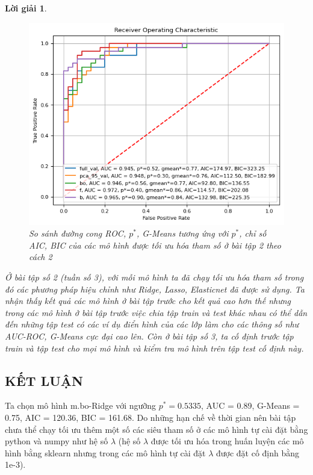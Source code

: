 \documentclass[14pt, a4paper]{article}
\theoremstyle{sltheorem}
\theoremstyle{soltheorem}
\newtheorem*{loigiai}{Lời giải}
\begin{document}
\begin{loigiai}
    \begin{figure}[h!]
        \centering
        \includegraphics[width=1.0\textwidth]{figures/ROC_Curve_AIC_BIC_Excercise_2_2.png}
        \caption{ So sánh đường cong ROC, $p^*$, G-Means tương ứng với $p^*$, chỉ số AIC, BIC của các mô hình được tối ưu hóa tham số ở bài tập 2 theo cách 2}
        \label{fig:ROC-Curve-AIC-BIC_Excercise-2-2}
    \end{figure}

    Ở bài tập số 2 (tuần số 3), với mỗi mô hình ta đã chạy tối ưu hóa tham số trong đó các phương pháp hiệu chỉnh như Ridge, Lasso, Elasticnet đã được sử dụng.
    Ta nhận thấy kết quả các mô hình ở bài tập trước cho kết quả cao hơn thế nhưng trong các mô hình ở bài tập trước việc chia tập train và test khác nhau có thể dẫn đến những tập test có các ví dụ điển hình của các lớp làm cho các thông số như AUC-ROC, G-Means cực đại cao lên.
    Còn ở bài tập số 3, ta cố định trước tập train và tập test cho mọi mô hình và kiểm tra mô hình trên tập test cố định này.
\end{loigiai}

\newpage
\begin{center}
    \section*{KẾT LUẬN}
    Ta chọn mô hình m.bo-Ridge với ngưỡng $p^*=0.5335$, AUC = 0.89, G-Means = 0.75, AIC = 120.36, BIC = 161.68.
    Do những hạn chế về thời gian nên bài tập chưa thể chạy tối ưu thêm một số các siêu tham số ở các mô hình tự cài đặt bằng python và numpy như hệ số $\lambda$ (hệ số $\lambda$ được tối ưu hóa trong huấn luyện các mô hình bằng sklearn nhưng trong các mô hình tự cài đặt $\lambda$ được đặt cố định bằng 1e-3).
\end{center}
\end{document}
